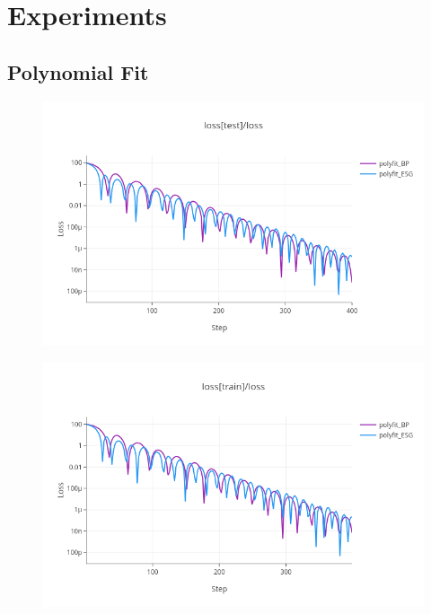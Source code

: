 \documentclass[nohyperref]{article}
\theoremstyle{plain}
\theoremstyle{definition}
\theoremstyle{remark}
\begin{document}
\section{Experiments}
\subsection{Polynomial Fit}
\begin{figure}[ht]
\vskip 0.2in
\begin{center}
\centerline{\includegraphics[width=\columnwidth]{images/polyfit_test.png}}
\caption{}
\end{center}
\vskip -0.2in
\end{figure}
\begin{figure}[ht]
\vskip 0.2in
\begin{center}
\centerline{\includegraphics[width=\columnwidth]{images/polyfit_train.png}}
\caption{}
\end{center}
\vskip -0.2in
\end{figure}
\end{document}
